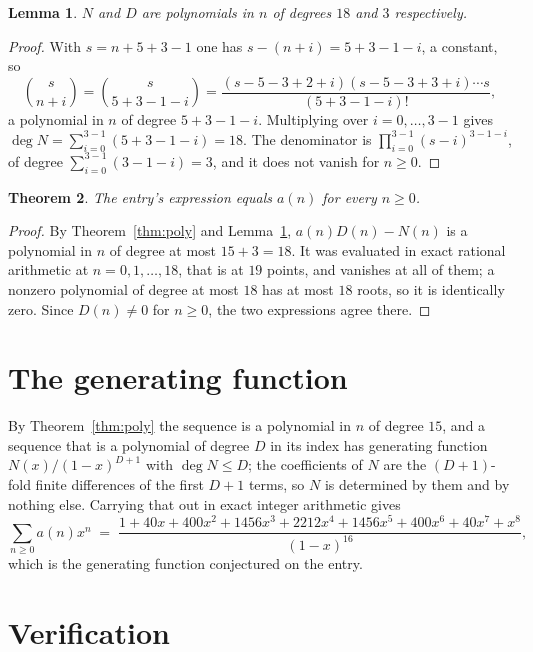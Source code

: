 \documentclass[11pt,a4paper]{article}
\theoremstyle{plain}
\newtheorem{theorem}{Theorem}
\newtheorem{lemma}[theorem]{Lemma}
\theoremstyle{definition}
\begin{document}
\begin{lemma}\label{lem:deg}
$N$ and $D$ are polynomials in $n$ of degrees $18$ and $3$ respectively.
\end{lemma}

\begin{proof}
With $s=n+5+3-1$ one has $s-(n+i)=5+3-1-i$, a constant, so
\[
\binom{s}{n+i}=\binom{s}{5+3-1-i}
=\frac{(s-5-3+2+i)(s-5-3+3+i)\cdots s}{(5+3-1-i)!},
\]
a polynomial in $n$ of degree $5+3-1-i$. Multiplying over $i=0,\dots,3-1$ gives
$\deg N=\sum_{i=0}^{3-1}(5+3-1-i)=18$. The denominator is
$\prod_{i=0}^{3-1}(s-i)^{3-1-i}$, of degree
$\sum_{i=0}^{3-1}(3-1-i)=3$, and it does not vanish for $n\ge0$.
\end{proof}

\begin{theorem}
The entry's expression equals $a(n)$ for every $n\ge0$.
\end{theorem}

\begin{proof}
By Theorem~\ref{thm:poly} and Lemma~\ref{lem:deg}, $a(n)D(n)-N(n)$ is a polynomial in $n$
of degree at most $15+3=18$. It was evaluated in exact rational arithmetic at
$n=0,1,\dots,18$, that is at $19$ points, and vanishes at all of them; a nonzero polynomial
of degree at most $18$ has at most $18$ roots, so it is identically zero. Since $D(n)\neq0$
for $n\ge0$, the two expressions agree there.
\end{proof}

\section{The generating function}

By Theorem~\ref{thm:poly} the sequence is a polynomial in $n$ of degree $15$, and a sequence
that is a polynomial of degree $D$ in its index has generating function $N(x)/(1-x)^{D+1}$
with $\deg N\le D$; the coefficients of $N$ are the $(D+1)$-fold finite differences of the
first $D+1$ terms, so $N$ is determined by them and by nothing else. Carrying that out in exact
integer arithmetic gives
\[
\sum_{n\ge0}a(n)x^n\;=\;\frac{1 + 40x + 400x^{2} + 1456x^{3} + 2212x^{4} + 1456x^{5} + 400x^{6} + 40x^{7} + x^{8}}{(1-x)^{16}},
\]
which is the generating function conjectured on the entry.

\section{Verification}
\end{document}
